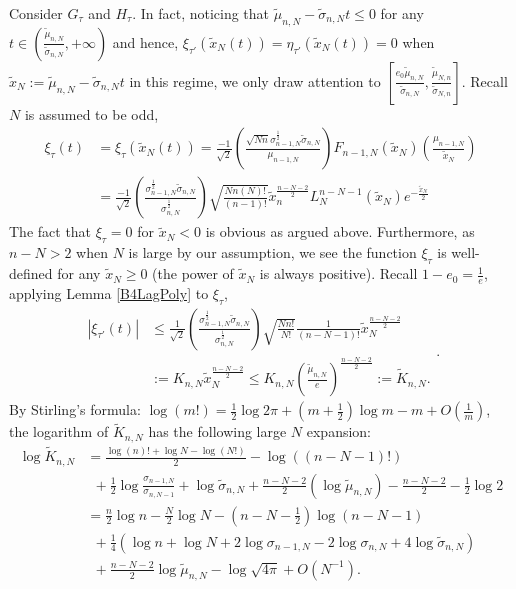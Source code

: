 \documentclass[11pt]{article}
\numberwithin{equation}{section}%
\numberwithin{theorem}{section}
\begin{document}
   Consider $G_{\tau}$ and $H_{\tau}$. In fact, noticing that $\tilde{\mu}_{n,N}-\tilde{\sigma}_{n,N}t\le0$ for any $t\in\left(\frac{\tilde{\mu}_{n,N}}{\tilde{\sigma}_{n,N}},+\infty\right)$ and hence, $\xi_{\tau'}(\tilde{x}_N(t))=\eta_{\tau'}(\tilde{x}_N(t))=0$ when $\tilde{x}_N:=\tilde{\mu}_{n,N}-\tilde{\sigma}_{n,N}t$ in this regime, we only draw attention to $\left[\frac{e_0\tilde\mu_{n,N}}{\tilde\sigma_{n,N}},\frac{\tilde{\mu}_{N,n}}{\tilde{\sigma}_{N,n}}\right]$. Recall $N$ is assumed to be odd,
\begin{equation*}
\begin{split}
    \xi_{\tau}(t)&=\xi_{\tau}(\tilde{x}_N(t))=\frac{-1}{\sqrt2}\left(\frac{\sqrt{Nn}\sigma_{n-1,N}^\frac{1}{2}\tilde{\sigma}_{n,N}}{\mu_{n-1,N}}\right)F_{n-1,N}\left(\tilde{x}_N\right)\left(\frac{\mu_{n-1,N}}{\tilde{x}_N}\right)\\
    &=\frac{-1}{\sqrt2}\left(\frac{\sigma^{\frac{1}{2}}_{n-1,N}\tilde{\sigma}_{n,N}}{\sigma_{n,N}^{\frac{1}{2}}}\right)\sqrt{\frac{Nn(N)!}{(n-1)!}}\tilde{x}_n^{\frac{n-N-2}{2}}L^{n-N-1}_N(\tilde{x}_N)e^{-\frac{\tilde{x}_N}{2}}
    \end{split}
\end{equation*}
The fact that $\xi_{\tau}=0$ for $\tilde{x}_N<0$ is obvious as argued above. Furthermore, as $n-N>2$ when $N$ is large by our assumption, we see the function $\xi_{\tau}$ is well-defined for any $\tilde{x}_N\ge 0$ (the power of $\tilde{x}_N$ is always positive). Recall  $1-e_0=\frac{1}{e}$, applying Lemma \ref{B4LagPoly} to $\xi_{\tau}$,
\begin{equation}\label{varsmall}
\begin{split}
       |\xi_{\tau'}(t)|&\le\frac{1}{\sqrt2}\left(\frac{\sigma^{\frac{1}{2}}_{n-1,N}\tilde{\sigma}_{n,N}}{\sigma_{n,N}^{\frac{1}{2}}}\right)\sqrt{\frac{Nn!}{N!}}\frac{1}{(n-N-1)!}\tilde{x}_N^{\frac{n-N-2}{2}}\\
       &:=K_{n,N}\tilde{x}_N^{\frac{n-N-2}{2}}\le K_{n,N}\left(\frac{\tilde{\mu}_{n,N}}{e}\right)^{\frac{n-N-2}{2}}:=\tilde{K}_{n,N}.
\end{split}.
\end{equation}
By Stirling's formula: $\log(m!)=\frac{1}{2}\log 2\pi+(m+\frac{1}{2})\log m-m+O\left(\frac{1}{m}\right)$, the logarithm of $\tilde{K}_{n,N}$ has the following large $N$ expansion:
\begin{equation}\label{logK'1}
    \begin{split}
       \log\tilde{K}_{n,N}&=\frac{\log (n)!+\log N
        -\log(N!)}{2}-\log((n-N-1)!)\\&~~+\frac{1}{2}\log\frac{\sigma_{n-1,N}}{\sigma_{n,N-1}}+\log\tilde{\sigma}_{n,N}+\frac{n-N-2}{2}\left(\log\tilde{\mu}_{n,N}\right)-\frac{n-N-2}{2}-\frac{1}{2}\log2\\
        &=\frac{n}{2}\log n-\frac{N}{2}\log N-\left(n-N-\frac{1}{2}\right)\log\left(n-N-1\right)\\
        &~~+\frac{1}{4}\left(\log n+\log N+2\log\sigma_{n-1,N}-2\log\sigma_{n,N}+4\log\tilde{\sigma}_{n,N}\right)\\&~~+\frac{n-N-2}{2}\log\tilde{\mu}_{n,N}-\log\sqrt{4\pi}+O\left(N^{-1}\right).
    \end{split}
\end{equation} 
\end{document}
